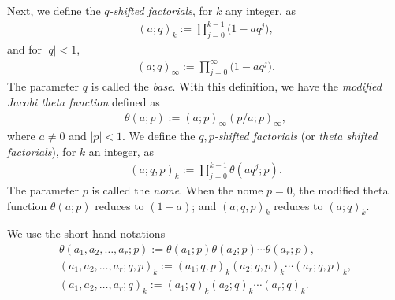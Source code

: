 \documentclass[pdftex]{sigma}
\numberwithin{equation}{section}
\newcommand{\qrfac}[2]{{\left({#1}; q\right)_{#2}}} %
\newcommand{\pqrfac}[3]{{\left({#1};#3\right)_{#2}}}
\newcommand{\ellipticqrfac}[2]{{\left({#1}; q, p\right)_{#2}}} %
\newcommand{\elliptictheta}[1]{\theta \left({#1} ; p\right) }
\begin{document}
Next, we define the {\em $q$-shifted factorials}, for $k$ any integer, as
\begin{gather*}
\qrfac{a}{k} :=\prod\limits_{j=0}^{k-1} \big(1-aq^j\big),
\end{gather*}
and for $|q|<1$,
\begin{gather*}
\qrfac{a}{\infty} := \prod\limits_{j=0}^{\infty} \big(1-aq^j\big).
\end{gather*}
The parameter $q$ is called the {\em base}. With this definition, we have the {\em modified Jacobi theta function} defined as
\begin{gather*} \elliptictheta{a} := \pqrfac{a}{\infty}{p} \pqrfac{p/a}{\infty}{p},\end{gather*}
where $a\neq 0$ and $|p|<1$. We define the {\em $q, p$-shifted factorials} (or {\em theta shifted factorials}), for $k$ an integer, as
\begin{gather*}
\ellipticqrfac{a}{k} := \prod\limits_{j=0}^{k-1} \elliptictheta{aq^j}.
\end{gather*}
The parameter $p$ is called the {\em nome}. When the nome $p=0$, the modified theta function $\elliptictheta{a}$ reduces to $(1-a)$; and $\ellipticqrfac{a}{k}$ reduces to $ \pqrfac{a}{k}{q}$.

We use the short-hand notations
\begin{gather*}
\elliptictheta{a_1, a_2, \dots, a_r} := \elliptictheta{a_1} \elliptictheta{a_2}\cdots \elliptictheta{a_r},\\
\ellipticqrfac{a_1, a_2,\dots, a_r}{k} := \ellipticqrfac{a_1}{k} \ellipticqrfac{a_2}{k}\cdots \ellipticqrfac{a_r}{k},\\
\qrfac{a_1, a_2,\dots, a_r}{k} := \qrfac{a_1}{k} \qrfac{a_2}{k}\cdots \qrfac{a_r}{k}.
\end{gather*}
\end{document}
